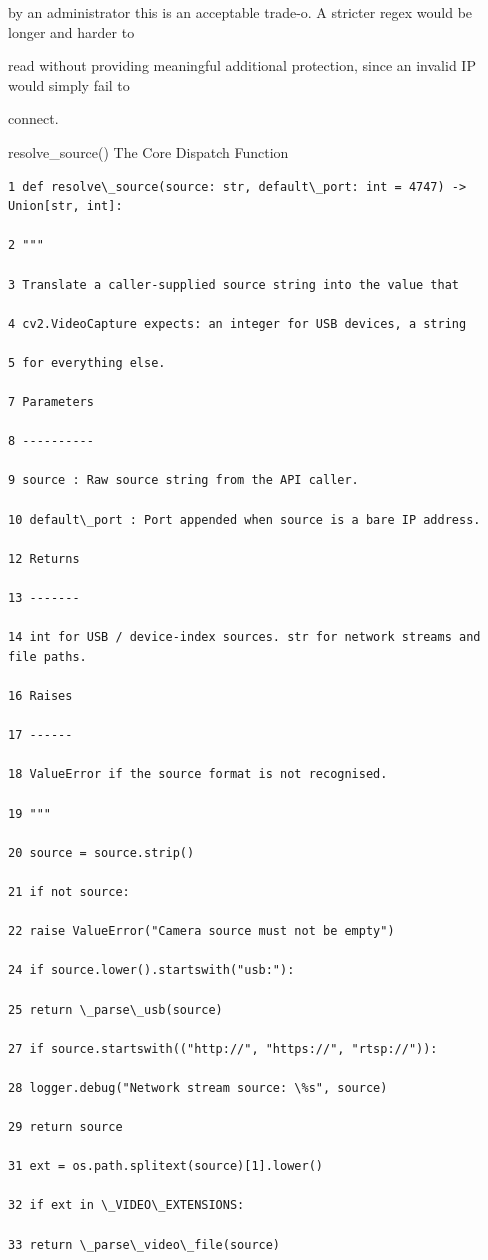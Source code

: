 by an administrator this is an acceptable trade-o. A stricter regex would be longer and harder to

read without providing meaningful additional protection, since an invalid IP would simply fail to

connect.

resolve\_source()  The Core Dispatch Function

\begin{listingbox}
	\begin{verbatim}
1 def resolve\_source(source: str, default\_port: int = 4747) -> Union[str, int]:

2 """

3 Translate a caller-supplied source string into the value that

4 cv2.VideoCapture expects: an integer for USB devices, a string

5 for everything else.

7 Parameters

8 ----------

9 source : Raw source string from the API caller.

10 default\_port : Port appended when source is a bare IP address.

12 Returns

13 -------

14 int for USB / device-index sources. str for network streams and file paths.

16 Raises

17 ------

18 ValueError if the source format is not recognised.

19 """

20 source = source.strip()

21 if not source:

22 raise ValueError("Camera source must not be empty")

24 if source.lower().startswith("usb:"):

25 return \_parse\_usb(source)

27 if source.startswith(("http://", "https://", "rtsp://")):

28 logger.debug("Network stream source: \%s", source)

29 return source

31 ext = os.path.splitext(source)[1].lower()

32 if ext in \_VIDEO\_EXTENSIONS:

33 return \_parse\_video\_file(source)


\end{verbatim}
\end{listingbox}
